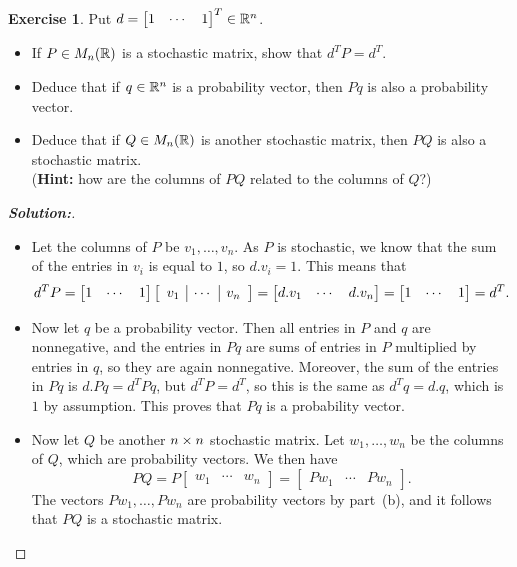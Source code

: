\documentclass[a4paper]{amsart}
\theoremstyle{definition}
\newtheorem{exercise}{Exercise}
\newenvironment{solution}{\begin{proof}[\textbf{Solution:}] \vphantom{u}}{\end{proof}}
\begin{document}
\begin{exercise}\label{ex-stochastic-i}
 Put $d=\left[\begin{matrix} 1 &\cdots&1\end{matrix}\right]^T\in{\mathbb{R}}^n$.
 \begin{itemize}
  \item[(a)] If $P\in M_n({\mathbb{R}})$ is a stochastic matrix, show that $d^TP=d^T$.
  \item[(b)] Deduce that if $q\in{\mathbb{R}}^n$ is a probability vector, then
   $Pq$ is also a probability vector.
  \item[(c)] Deduce that if $Q\in M_n({\mathbb{R}})$ is another stochastic
   matrix, then $PQ$ is also a stochastic matrix.\\
   (\textbf{Hint:} how are the columns of $PQ$ related to the columns
   of $Q$?)
 \end{itemize}
\end{exercise}
\begin{solution}
 \begin{itemize}
  \item[(a)] Let the columns of $P$ be $v_1,\dotsc,v_n$.  As $P$ is
   stochastic, we know that the sum of the entries in $v_i$  is equal
   to $1$, so $d.v_i=1$.  This means that
   \[ d^TP =
      \left[\begin{matrix} 1 &\cdots& 1\end{matrix}\right] 
       \left[\begin{array}{c|c|c} 
       v_1 & \cdots & v_n 
      \end{array}\right] = 
      \left[\begin{matrix} d.v_1 & \cdots & d.v_n \end{matrix}\right] = 
      \left[\begin{matrix} 1 & \cdots & 1 \end{matrix}\right] = d^T.
   \]
  \item[(b)] Now let $q$ be a probability vector.  Then all entries in
   $P$ and $q$ are nonnegative, and the entries in $Pq$ are sums of
   entries in $P$ multiplied by entries in $q$, so they are again
   nonnegative.  Moreover, the sum of the entries in $Pq$ is
   $d.Pq=d^TPq$, but $d^TP=d^T$, so this is the same as $d^Tq=d.q$,
   which is $1$ by assumption.  This proves that $Pq$ is a probability
   vector.
  \item[(c)] Now let $Q$ be another $n\times n$ stochastic matrix.  Let
   $w_1,\dotsc,w_n$ be the columns of $Q$, which are probability
   vectors.  We then have
   \[ PQ 
       = P \left[\begin{array}{c|c|c} 
            w_1 & \cdots & w_n 
           \end{array}\right] 
       =  \left[\begin{array}{c|c|c} 
            Pw_1 & \cdots & Pw_n 
           \end{array}\right].
   \]
   The vectors $Pw_1,\dotsc,Pw_n$ are probability vectors by part~(b),
   and it follows that $PQ$ is a stochastic matrix.
 \end{itemize}
\end{solution}
\end{document}

